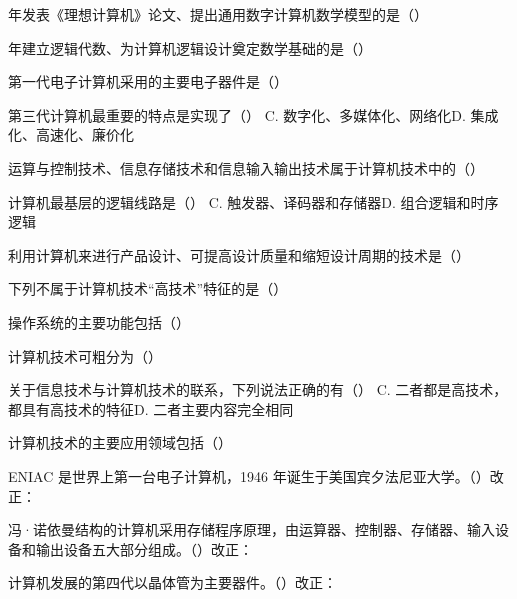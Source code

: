 \documentclass[a4paper,11pt]{article}
\begin{document}
 年发表《理想计算机》论文、提出通用数字计算机数学模型的是（\quad）

 年建立逻辑代数、为计算机逻辑设计奠定数学基础的是（\quad）

\q 第一代电子计算机采用的主要电子器件是（\quad）

\q 第三代计算机最重要的特点是实现了（\quad）
{C. 数字化、多媒体化、网络化}{D. 集成化、高速化、廉价化}

\q 运算与控制技术、信息存储技术和信息输入输出技术属于计算机技术中的（\quad）

\q 计算机最基层的逻辑线路是（\quad）
{C. 触发器、译码器和存储器}{D. 组合逻辑和时序逻辑}

\q 利用计算机来进行产品设计、可提高设计质量和缩短设计周期的技术是（\quad）

\q 下列不属于计算机技术“高技术”特征的是（\quad）

\q 操作系统的主要功能包括（\quad）

\q 计算机技术可粗分为（\quad）

\q 关于信息技术与计算机技术的联系，下列说法正确的有（\quad）
{C. 二者都是高技术，都具有高技术的特征}{D. 二者主要内容完全相同}

\q 计算机技术的主要应用领域包括（\quad）

\q ENIAC 是世界上第一台电子计算机，1946 年诞生于美国宾夕法尼亚大学。\quad（\quad）\quad 改正：\fixblank

\q 冯·诺依曼结构的计算机采用存储程序原理，由运算器、控制器、存储器、输入设备和输出设备五大部分组成。\quad（\quad）\quad 改正：\fixblank

\q 计算机发展的第四代以晶体管为主要器件。\quad（\quad）\quad 改正：\fixblank
\end{document}
